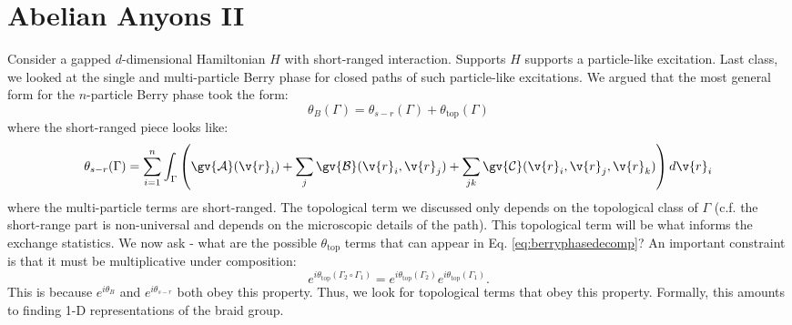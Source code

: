 \section{Abelian Anyons II}

Consider a gapped $d$-dimensional Hamiltonian $H$ with short-ranged interaction. Supports $H$ supports a particle-like excitation. Last class, we looked at the single and multi-particle Berry phase for closed paths of such particle-like excitations. We argued that the most general form for the $n$-particle Berry phase took the form:
\begin{equation}\label{eq:berryphasedecomp}
    \theta_B(\Gamma) = \theta_{s-r}(\Gamma) + \theta_{\text{top}}(\Gamma)
\end{equation}
where the short-ranged piece looks like:
\begin{equation}
    \theta_{s-r}(\Gamma) = \sum_{i=1}^n \int_{\Gamma}\left(\gv{\mathcal{A}}(\v{r}_i) + \sum_j \gv{\mathcal{B}}(\v{r}_i, \v{r}_j) + \sum_{jk}\gv{\mathcal{C}}(\v{r}_i, \v{r}_j, \v{r}_k)\right)d\v{r}_i
\end{equation}
where the multi-particle terms are short-ranged. The topological term we discussed only depends on the topological class of $\Gamma$ (c.f. the short-range part is non-universal and depends on the microscopic details of the path). This topological term will be what informs the exchange statistics. We now ask - what are the possible $\theta_{\text{top}}$ terms that can appear in Eq. \eqref{eq:berryphasedecomp}? An important constraint is that it must be multiplicative under composition:
\begin{equation}\label{eq:comp}
    e^{i\theta_{\text{top}}(\Gamma_2 \circ \Gamma_1)} = e^{i\theta_{\text{top}}(\Gamma_2)}e^{i\theta_{\text{top}}(\Gamma_1)}.
\end{equation}
This is because $e^{i\theta_B}$ and $e^{i\theta_{s-r}}$ both obey this property. Thus, we look for topological terms that obey this property. Formally, this amounts to finding 1-D representations of the braid group.

